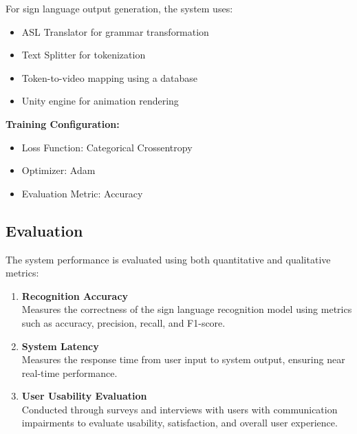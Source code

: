 For sign language output generation, the system uses:
\begin{itemize}
    \item ASL Translator for grammar transformation
    \item Text Splitter for tokenization
    \item Token-to-video mapping using a database
    \item Unity engine for animation rendering
\end{itemize}

\textbf{Training Configuration:}
\begin{itemize}
    \item Loss Function: Categorical Crossentropy
    \item Optimizer: Adam
    \item Evaluation Metric: Accuracy
\end{itemize}


\subsection{Evaluation}

The system performance is evaluated using both quantitative and qualitative metrics:

\begin{enumerate}
    \item \textbf{Recognition Accuracy} \\
    Measures the correctness of the sign language recognition model using metrics such as accuracy, precision, recall, and F1-score.
    
    \item \textbf{System Latency} \\
    Measures the response time from user input to system output, ensuring near real-time performance.
    
    \item \textbf{User Usability Evaluation} \\
    Conducted through surveys and interviews with users with communication impairments to evaluate usability, satisfaction, and overall user experience.
\end{enumerate}